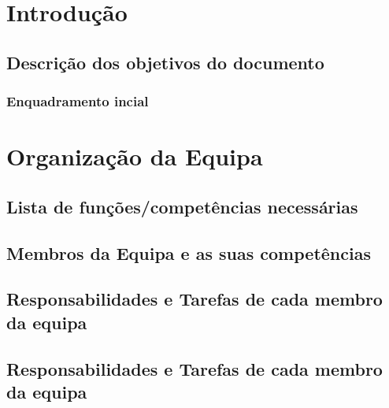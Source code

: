 \chapter{Introdução}
\label{introdução}
\section{Descrição dos objetivos do documento}
\subsection{Enquadramento incial}

\chapter{Organização da Equipa}
\section{Lista de funções/competências necessárias}
\section{Membros da Equipa e as suas competências}
\section{Responsabilidades e Tarefas de cada membro da equipa}
\section{Responsabilidades e Tarefas de cada membro da equipa}